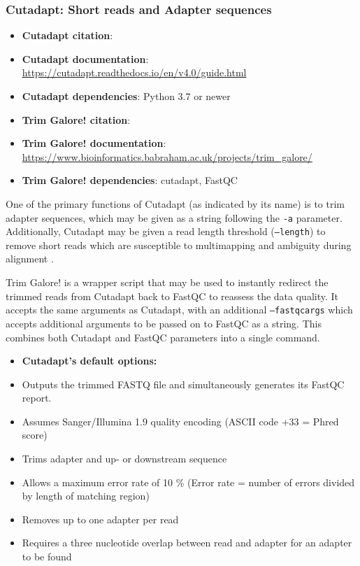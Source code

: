 \subsubsection{Cutadapt: Short reads and Adapter sequences}
\label{cutadapt}
\begin{itemize}\itemsep-0.5em
\item[]\textbf{Cutadapt citation}: 				\cite{martin2011cutadapt}
\item[]\textbf{Cutadapt documentation}: 	\url{https://cutadapt.readthedocs.io/en/v4.0/guide.html}
\item[]\textbf{Cutadapt dependencies}: Python 3.7 or newer
\item[]\textbf{Trim Galore! citation}: 				\cite{trimgalore}
\item[]\textbf{Trim Galore! documentation}: 	\url{https://www.bioinformatics.babraham.ac.uk/projects/trim_galore/}
\item[]\textbf{Trim Galore! dependencies}: cutadapt, FastQC
\end{itemize}


One of the primary functions of Cutadapt (as indicated by its name) is to trim adapter sequences, which may be given as a string following the \texttt{-a} parameter. Additionally, Cutadapt may be given a read length threshold (\texttt{--length}) to remove short reads which are susceptible to multimapping and ambiguity during alignment \citep{deschamps2020handling}. 

Trim Galore! is a wrapper script that may be used to instantly redirect the trimmed reads from Cutadapt back to FastQC to reassess the data quality. It accepts the same arguments as Cutadapt, with an additional \texttt{--fastqc\textunderscore args} which accepts additional arguments to be passed on to FastQC as a string. This combines both Cutadapt and FastQC parameters into a single command. 

\begin{itemize}\itemsep0em
\item[] \textbf{Cutadapt's default options:}
\item Outputs the trimmed FASTQ file and simultaneously generates its FastQC report.
\item Assumes Sanger/Illumina 1.9 quality encoding (ASCII code +33 = Phred score)
\item Trims adapter and up- or downstream sequence
\item Allows a maximum error rate of 10 \% (Error rate = number of errors divided by length of matching region)
\item Removes up to one adapter per read
\item Requires a three nucleotide overlap between read and adapter for an adapter to be found
\end{itemize}


